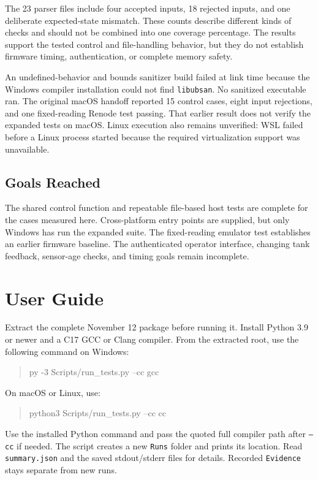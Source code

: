 \documentclass[conference]{IEEEtran}
\begin{document}
The 23 parser files include four accepted inputs, 18 rejected inputs, and one deliberate expected-state mismatch. These counts describe different kinds of checks and should not be combined into one coverage percentage. The results support the tested control and file-handling behavior, but they do not establish firmware timing, authentication, or complete memory safety.

An undefined-behavior and bounds sanitizer build failed at link time because the Windows compiler installation could not find \texttt{libubsan}. No sanitized executable ran. The original macOS handoff reported 15 control cases, eight input rejections, and one fixed-reading Renode test passing. That earlier result does not verify the expanded tests on macOS. Linux execution also remains unverified: WSL failed before a Linux process started because the required virtualization support was unavailable.

\subsection{Goals Reached}
The shared control function and repeatable file-based host tests are complete for the cases measured here. Cross-platform entry points are supplied, but only Windows has run the expanded suite. The fixed-reading emulator test establishes an earlier firmware baseline. The authenticated operator interface, changing tank feedback, sensor-age checks, and timing goals remain incomplete.

\section{User Guide}
Extract the complete November 12 package before running it. Install Python 3.9 or newer and a C17 GCC or Clang compiler. From the extracted root, use the following command on Windows:
\begin{quote}\small\ttfamily
py -3 Scripts/run\_tests.py --cc gcc
\end{quote}
On macOS or Linux, use:
\begin{quote}\small\ttfamily
python3 Scripts/run\_tests.py --cc cc
\end{quote}
Use the installed Python command and pass the quoted full compiler path after \texttt{--cc} if needed. The script creates a new \texttt{Runs} folder and prints its location. Read \texttt{summary.json} and the saved stdout/stderr files for details. Recorded \texttt{Evidence} stays separate from new runs.
\end{document}
